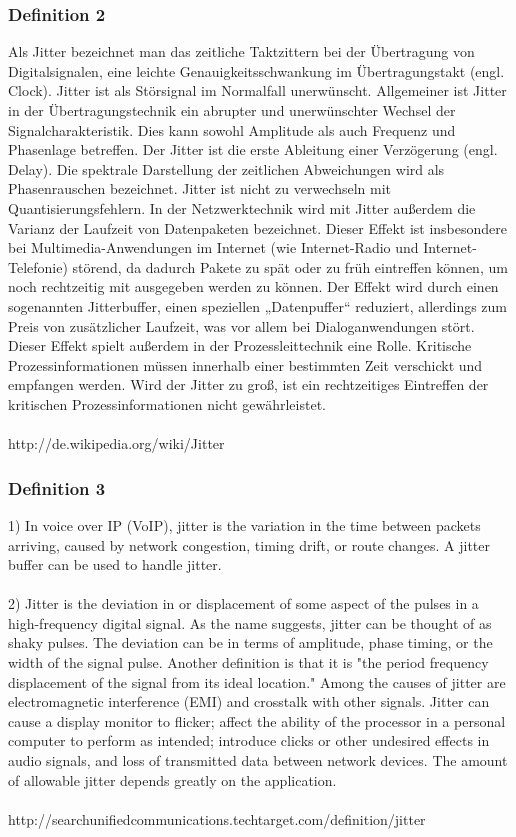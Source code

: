 \documentclass[a4paper,12pt]{scrartcl}
\begin{document}
\subsubsection{Definition 2}
Als Jitter bezeichnet man das zeitliche Taktzittern bei der Übertragung von Digitalsignalen, eine leichte Genauigkeitsschwankung im Übertragungstakt (engl. Clock). Jitter ist als Störsignal im Normalfall unerwünscht. Allgemeiner ist Jitter in der Übertragungstechnik ein abrupter und unerwünschter Wechsel der Signalcharakteristik. Dies kann sowohl Amplitude als auch Frequenz und Phasenlage betreffen. Der Jitter ist die erste Ableitung einer Verzögerung (engl. Delay). Die spektrale Darstellung der zeitlichen Abweichungen wird als Phasenrauschen bezeichnet. Jitter ist nicht zu verwechseln mit Quantisierungsfehlern.
In der Netzwerktechnik wird mit Jitter außerdem die Varianz der Laufzeit von Datenpaketen bezeichnet. Dieser Effekt ist insbesondere bei Multimedia-Anwendungen im Internet (wie Internet-Radio und Internet-Telefonie) störend, da dadurch Pakete zu spät oder zu früh eintreffen können, um noch rechtzeitig mit ausgegeben werden zu können. Der Effekt wird durch einen sogenannten Jitterbuffer, einen speziellen „Datenpuffer“ reduziert, allerdings zum Preis von zusätzlicher Laufzeit, was vor allem bei Dialoganwendungen stört. Dieser Effekt spielt außerdem in der Prozessleittechnik eine Rolle. Kritische Prozessinformationen müssen innerhalb einer bestimmten Zeit verschickt und empfangen werden. Wird der Jitter zu groß, ist ein rechtzeitiges Eintreffen der kritischen Prozessinformationen nicht gewährleistet. \\
\\
http://de.wikipedia.org/wiki/Jitter

\subsubsection{Definition 3}
1) In voice over IP (VoIP), jitter is the variation in the time between packets arriving, caused by network congestion, timing drift, or route changes. A jitter buffer can be used to handle jitter. \\
\\
2) Jitter is the deviation in or displacement of some aspect of the pulses in a high-frequency digital signal. As the name suggests, jitter can be thought of as shaky pulses. The deviation can be in terms of amplitude, phase timing, or the width of the signal pulse. Another definition is that it is "the period frequency displacement of the signal from its ideal location." Among the causes of jitter are electromagnetic interference (EMI) and crosstalk with other signals. Jitter can cause a display monitor to flicker; affect the ability of the processor in a personal computer to perform as intended; introduce clicks or other undesired effects in audio signals, and loss of transmitted data between network devices. The amount of allowable jitter depends greatly on the application.\\
\\
http://searchunifiedcommunications.techtarget.com/definition/jitter
\end{document}
